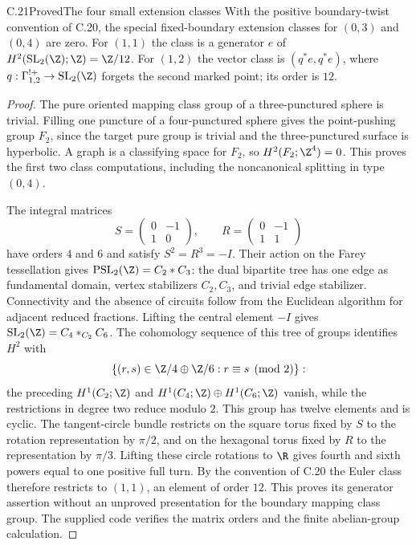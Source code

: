 \begin{claim}{C.21}{Proved}{The four small extension classes}
With the positive boundary-twist convention of C.20, the special
fixed-boundary extension classes for $(0,3)$ and $(0,4)$ are zero. For
$(1,1)$ the class is a generator $e$ of
$H^2(\operatorname{SL}_2(\Z);\Z)=\Z/12$. For $(1,2)$ the vector class
is $(q^*e,q^*e)$, where
$q:\Gamma^{!+}_{1,2}\to\operatorname{SL}_2(\Z)$ forgets the second
marked point; its order is $12$.
\end{claim}
\begin{proof}
The pure oriented mapping class group of a three-punctured sphere is
trivial. Filling one puncture of a four-punctured sphere gives the
point-pushing group $F_2$, since the target pure group is trivial and
the three-punctured surface is hyperbolic. A graph is a classifying space
for $F_2$, so $H^2(F_2;\Z^4)=0$. This proves the first two class
computations, including the noncanonical splitting in type $(0,4)$.

The integral matrices
\[
 S=\begin{pmatrix}0&-1\\1&0\end{pmatrix},\qquad
 R=\begin{pmatrix}0&-1\\1&1\end{pmatrix}
\]
have orders $4$ and $6$ and satisfy $S^2=R^3=-I$.
Their action on the Farey tessellation gives
$\operatorname{PSL}_2(\Z)=C_2*C_3$: the dual bipartite tree has one
edge as fundamental domain, vertex stabilizers $C_2,C_3$, and trivial
edge stabilizer. Connectivity and the absence of circuits follow from
the Euclidean algorithm for adjacent reduced fractions. Lifting the
central element $-I$ gives
$\operatorname{SL}_2(\Z)=C_4*_{C_2}C_6$. The cohomology sequence of
this tree of groups identifies $H^2$ with
\[
 \{(r,s)\in\Z/4\oplus\Z/6:r\equiv s\pmod2\}:
\]
the preceding $H^1(C_2;\Z)$ and $H^1(C_4;\Z)\oplus
H^1(C_6;\Z)$ vanish, while the restrictions in degree two reduce
modulo $2$. This group has twelve elements and is cyclic.
The tangent-circle bundle restricts on the square torus fixed by $S$
to the rotation representation by $\pi/2$, and on the hexagonal torus
fixed by $R$ to the representation by $\pi/3$. Lifting these circle
rotations to $\R$ gives fourth and sixth powers equal to one positive
full turn. By the convention of C.20 the Euler class therefore
restricts to $(1,1)$, an element of order $12$. This proves its generator
assertion without an unproved presentation for the boundary mapping
class group. The supplied code verifies the matrix orders and the
finite abelian-group calculation.


\end{proof}
